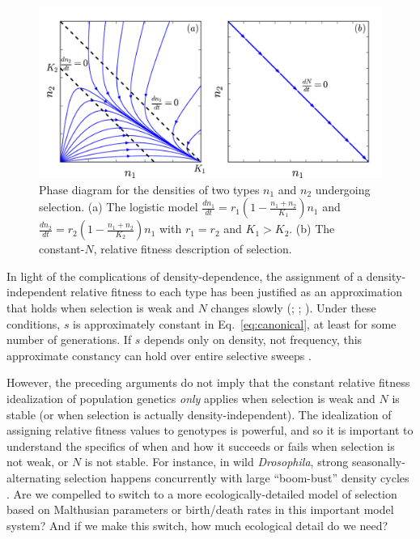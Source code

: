 \documentclass[12pt]{article}
\begin{document}
\begin{figure}
\centering
\includegraphics[scale=0.8]{Kplot.pdf}
\caption{\label{fig:Ksel} Phase diagram for the densities of two types $n_1$ and $n_2$ undergoing selection. (a) The logistic model $\frac{dn_1}{dt}=r_1(1-\frac{n_1+n_2}{K_1})n_1$ and $\frac{dn_2}{dt}=r_2(1-\frac{n_1+n_2}{K_2})n_1$ with $r_1=r_2$ and $K_1>K_2$. (b) The constant-$N$, relative fitness description of selection.}
\end{figure}

In light of the complications of density-dependence, the assignment of a density-independent relative fitness to each type has been justified as an approximation that holds when selection is weak and $N$ changes slowly (\citealt{kimura1969natural}; \citealt[pp. 277]{ewens_2004}; \citealt[Chap. 4]{charlesworth_1994}). Under these conditions, $s$ is approximately constant in Eq.~\eqref{eq:canonical}, at least for some number of generations. If $s$ depends only on density, not frequency, this approximate constancy can hold over entire selective sweeps \citep[Fig. 9.5]{otto_2011}. 

However, the preceding arguments do not imply that the constant relative fitness idealization of population genetics \textit{only} applies when selection is weak and $N$ is stable (or when selection is actually density-independent). The idealization of assigning relative fitness values to genotypes is powerful, and so it is important to understand the specifics of when and how it succeeds or fails when selection is not weak, or $N$ is not stable. For instance, in wild \textit{Drosophila}, strong seasonally-alternating selection happens concurrently with large ``boom-bust'' density cycles \citep{messer_2016,bergland_14}. Are we compelled to switch to a more ecologically-detailed model of selection based on Malthusian parameters or birth/death rates in this important model system? And if we make this switch, how much ecological detail do we need? 
\end{document}

